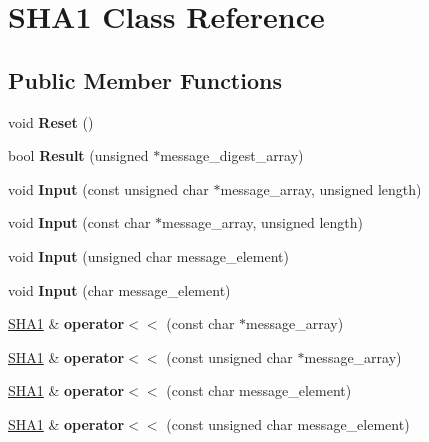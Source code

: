 \hypertarget{classSHA1}{\section{S\-H\-A1 Class Reference}
\label{classSHA1}
}
\subsection*{Public Member Functions}
\begin{DoxyCompactItemize}
\item 
\hypertarget{classSHA1_accec3092d91c84d7e71d32c681357119}{void {\bfseries Reset} ()}\label{classSHA1_accec3092d91c84d7e71d32c681357119}

\item 
\hypertarget{classSHA1_ab374ecf64d54cc133805322370f3b0f1}{bool {\bfseries Result} (unsigned $\ast$message\-\_\-digest\-\_\-array)}\label{classSHA1_ab374ecf64d54cc133805322370f3b0f1}

\item 
\hypertarget{classSHA1_a5612d5feb8202a4930aa271df8cbf102}{void {\bfseries Input} (const unsigned char $\ast$message\-\_\-array, unsigned length)}\label{classSHA1_a5612d5feb8202a4930aa271df8cbf102}

\item 
\hypertarget{classSHA1_a0c7555ddc781f3834c0a6218d1edc98e}{void {\bfseries Input} (const char $\ast$message\-\_\-array, unsigned length)}\label{classSHA1_a0c7555ddc781f3834c0a6218d1edc98e}

\item 
\hypertarget{classSHA1_af4d21901eb9ed48d8f8a16d0ec166829}{void {\bfseries Input} (unsigned char message\-\_\-element)}\label{classSHA1_af4d21901eb9ed48d8f8a16d0ec166829}

\item 
\hypertarget{classSHA1_a0fb5a35d1bc54e568d8774f966441c41}{void {\bfseries Input} (char message\-\_\-element)}\label{classSHA1_a0fb5a35d1bc54e568d8774f966441c41}

\item 
\hypertarget{classSHA1_a5d334b9a7847596c51e671ae8fded37b}{\hyperlink{classSHA1}{S\-H\-A1} \& {\bfseries operator$<$$<$} (const char $\ast$message\-\_\-array)}\label{classSHA1_a5d334b9a7847596c51e671ae8fded37b}

\item 
\hypertarget{classSHA1_a4debec5cf6b08eb019c5fddb2f2ec68f}{\hyperlink{classSHA1}{S\-H\-A1} \& {\bfseries operator$<$$<$} (const unsigned char $\ast$message\-\_\-array)}\label{classSHA1_a4debec5cf6b08eb019c5fddb2f2ec68f}

\item 
\hypertarget{classSHA1_adfbd48831872d9b54bde3cd3963cfed2}{\hyperlink{classSHA1}{S\-H\-A1} \& {\bfseries operator$<$$<$} (const char message\-\_\-element)}\label{classSHA1_adfbd48831872d9b54bde3cd3963cfed2}

\item 
\hypertarget{classSHA1_a52d73d41b7fc85895aadb8cea3b822ab}{\hyperlink{classSHA1}{S\-H\-A1} \& {\bfseries operator$<$$<$} (const unsigned char message\-\_\-element)}\label{classSHA1_a52d73d41b7fc85895aadb8cea3b822ab}

\end{DoxyCompactItemize}
